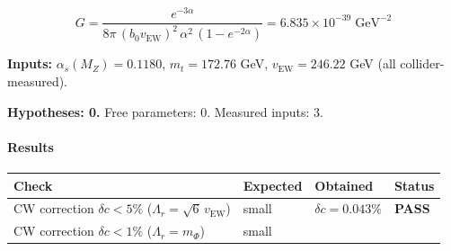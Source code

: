 \documentclass[
  11pt,
]{article}
\begin{document}
\[\boxed{G = \frac{e^{-3\alpha}}{8\pi\,(b_0 v_\text{EW})^2\,\alpha^2\,(1 - e^{-2\alpha})} = 6.835 \times 10^{-39}\;\text{GeV}^{-2}} \tag{164}\]

\textbf{Inputs:} \(\alpha_s(M_Z) = 0.1180\), \(m_t = 172.76\) GeV,
\(v_\text{EW} = 246.22\) GeV (all collider-measured).

\textbf{Hypotheses: 0.} Free parameters: 0. Measured inputs: 3.

\bigskip

\hypertarget{results-11}{%
\paragraph{Results}\label{results-11}}

\begin{longtable}[]{@{}llll@{}}
\toprule
\begin{minipage}[b]{0.22\columnwidth}\raggedright
Check\strut
\end{minipage} & \begin{minipage}[b]{0.22\columnwidth}\raggedright
Expected\strut
\end{minipage} & \begin{minipage}[b]{0.22\columnwidth}\raggedright
Obtained\strut
\end{minipage} & \begin{minipage}[b]{0.22\columnwidth}\raggedright
Status\strut
\end{minipage}\tabularnewline
\midrule
\endhead
\begin{minipage}[t]{0.22\columnwidth}\raggedright
CW correction \(\delta c < 5\%\)
(\(\Lambda_r = \sqrt{6}\,v_\text{EW}\))\strut
\end{minipage} & \begin{minipage}[t]{0.22\columnwidth}\raggedright
small\strut
\end{minipage} & \begin{minipage}[t]{0.22\columnwidth}\raggedright
\(\delta c = 0.043\%\)\strut
\end{minipage} & \begin{minipage}[t]{0.22\columnwidth}\raggedright
\textbf{PASS}\strut
\end{minipage}\tabularnewline
\begin{minipage}[t]{0.22\columnwidth}\raggedright
CW correction \(\delta c < 1\%\) (\(\Lambda_r = m_\Phi\))\strut
\end{minipage} & \begin{minipage}[t]{0.22\columnwidth}\raggedright
small\strut
\end{minipage} & \begin{minipage}[t]{0.22\columnwidth}\raggedright

\end{minipage}
\end{longtable}
\end{document}
